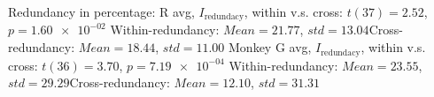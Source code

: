 Redundancy in percentage: \nMonkey R avg, $I_\textrm{redundacy}$, within v.s. cross: $t(37) = 2.52$, $p = \num{1.60e-02}$ 
Within-redundancy: $Mean = 21.77$, $std = 13.04$Cross-redundancy: $Mean = 18.44$, $std = 11.00$ 
Monkey G avg, $I_\textrm{redundacy}$, within v.s. cross: $t(36) = 3.70$, $p = \num{7.19e-04}$ 
Within-redundancy: $Mean = 23.55$, $std = 29.29$Cross-redundancy: $Mean = 12.10$, $std = 31.31$ 
